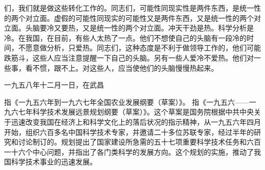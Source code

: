 们，我们就是做这些转化工作的。同志们，可能性同现实性是两件东西，是统一性的两个对立面。虚假的可能性同现实的可能性又是两件东西，又是统一性的两个对立面。头脑要冷又要热，又是统一性的两个对立面。冲天干劲是热。科学分析是冷。在我国，在目前，有些人太热了一点。他们不想使自己的头脑有一段冷的时间，不愿意做分析，只爱热。同志们，这种态度是不利于做领导工作的，他们可能跌筋斗，这些人应当注意提醒一下自己的头脑。另有一些人爱冷不爱热。他们对一些事，看不惯，跟不上。对这些人，应当使他们的头脑慢慢热起来。

一九五八年十二月一日，在武昌

\begin{maonote}
指《一九五六年到一九六七年全国农业发展纲要（草案）》。
指《一九五六——一九六七年科学技术发展远景规划纲要（草案）》。这个草案是国务院根据中共中央关于迅速改变我国在经济上和科学文化上的落后状况的指示精神，从一九五六年四月开始，组织六百多名中国科学技术专家，并邀请二十多位苏联专家，经过半年的研究和讨论制订的。规划提出了国家建设所急需的五十七项重要科学技术任务和六百一十六个中心问题，并指出了各门类科学的发展方向。这个规划的实施，推动了我国科学技术事业的迅速发展。
\end{maonote}
